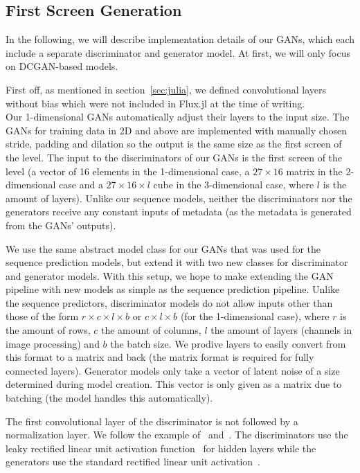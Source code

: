 \subsection{First Screen Generation}
\label{sec:first-screen-generation}


In the following, we will describe implementation details of our GANs,
which each include a separate discriminator and generator model.
At first, we will only focus on DCGAN-based models.

First off, as mentioned in section~\ref{sec:julia}, we defined
convolutional layers without bias which were not included in Flux.jl
at the time of writing. \\
Our 1-dimensional GANs automatically adjust their layers to the input
size. The GANs for training data in 2D and above are implemented with
manually chosen stride, padding and dilation so the output is the same
size as the first screen of the level. The input to the discriminators
of our GANs is the first screen of the level (a vector of 16 elements
in the 1-dimensional case, a $27 \times 16$ matrix in the
2-dimensional case and a $27 \times 16 \times l$ cube in the
3-dimensional case, where $l$ is the amount of layers). Unlike our
sequence models, neither the discriminators nor the generators receive
any constant inputs of metadata (as the metadata is generated from the
GANs' outputs).

We use the same abstract model class for our GANs that was used for
the sequence prediction models, but extend it with two new classes for
discriminator and generator models. With this setup, we hope to make
extending the GAN pipeline with new models as simple as the sequence
prediction pipeline. Unlike the sequence predictors, discriminator
models do not allow inputs other than those of the form
$r \times c \times l \times b$ or $c \times l \times b$ (for the
1-dimensional case), where $r$ is the amount of rows, $c$ the amount
of columns, $l$ the amount of layers (channels in image processing)
and $b$ the batch size. We prodive layers to easily convert from this
format to a matrix and back (the matrix format is required for fully
connected layers). Generator models only take a vector of latent noise
of a size determined during model creation. This vector is only given
as a matrix due to batching (the model handles this automatically).

The first convolutional layer of the discriminator is not followed by
a normalization layer. We follow the example
of~\cite{PytorchExamples2019}
and~\cite{martinarjovskyMartinarjovskyWassersteinGAN2019}. The
discriminators use the leaky rectified linear unit activation
function~\cite{RectifierNeuralNetworks2019} for hidden layers while
the generators use the standard rectified linear unit
activation~\cite{RectifierNeuralNetworks2019}.

